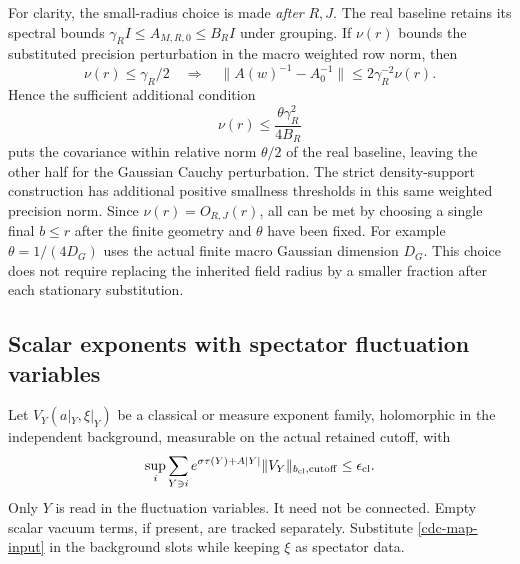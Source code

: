 \documentclass[11pt]{article}
\theoremstyle{remark}
\begin{document}
For clarity, the small-radius choice is made \emph{after} $R,J$.
The real baseline retains its spectral bounds
$\gamma_R I\leq A_{M,R,0}\leq B_RI$ under grouping. If
$\nu(r)$ bounds the substituted precision perturbation in the
macro weighted row norm, then
\begin{equation}
 \nu(r)\leq\gamma_R/2
 \quad\Longrightarrow\quad
 \|A(w)^{-1}-A_0^{-1}\|
             \leq2\gamma_R^{-2}\nu(r).
 \label{cdc-covariance-comparison}
\end{equation}
Hence the sufficient additional condition
\begin{equation}
 \nu(r)\leq\frac{\theta\gamma_R^2}{4B_R}
 \label{cdc-relative-neighborhood}
\end{equation}
puts the covariance within relative norm $\theta/2$ of the real
baseline, leaving the other half for the Gaussian Cauchy
perturbation. The strict density-support construction has
additional positive smallness thresholds in this same weighted
precision norm. Since $\nu(r)=O_{R,J}(r)$, all can be met by
choosing a single final $b\leq r$ after the finite geometry and
$\theta$ have been fixed. For example
$\theta=1/(4D_G)$ uses the actual finite macro Gaussian
dimension $D_G$. This choice does not require replacing the
inherited field radius by a smaller fraction after each
stationary substitution.

\subsection{Scalar exponents with spectator fluctuation variables}
\label{cdc-scalar-section}

Let $V_Y(a|_Y,\xi|_Y)$ be a classical or measure exponent family,
holomorphic in the independent background, measurable on the
actual retained cutoff, with
\begin{equation}
 \sup_i\sum_{Y\ni i}e^{\sigma\tau(Y)+A|Y|}
             \|V_Y\|_{b_{\rm cl},{\rm cutoff}}
 \leq\epsilon_{\rm cl}.
 \label{cdc-scalar-input}
\end{equation}
Only $Y$ is read in the fluctuation variables. It need not be
connected. Empty scalar vacuum terms, if present, are tracked
separately. Substitute \eqref{cdc-map-input} in the background
slots while keeping $\xi$ as spectator data.
\end{document}
